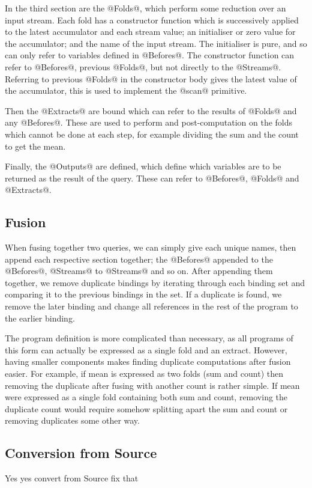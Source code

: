 In the third section are the @Folds@, which perform some reduction over an input stream.
Each fold has a constructor function which is successively applied to the latest accumulator and each stream value; an initialiser or zero value for the accumulator; and the name of the input stream.
The initialiser is pure, and so can only refer to variables defined in @Befores@.
The constructor function can refer to @Befores@, previous @Folds@, but not directly to the @Streams@.
Referring to previous @Folds@ in the constructor body gives the latest value of the accumulator, this is used to implement the @scan@ primitive.

Then the @Extracts@ are bound which can refer to the results of @Folds@ and any @Befores@.
These are used to perform and post-computation on the folds which cannot be done at each step, for example dividing the sum and the count to get the mean.

Finally, the @Outputs@ are defined, which define which variables are to be returned as the result of the query.
These can refer to @Befores@, @Folds@ and @Extracts@.

\subsection{Fusion}

When fusing together two queries, we can simply give each unique names, then append each respective section together; the @Befores@ appended to the @Befores@, @Streams@ to @Streams@ and so on.
After appending them together, we remove duplicate bindings by iterating through each binding set and comparing it to the previous bindings in the set.
If a duplicate is found, we remove the later binding and change all references in the rest of the program to the earlier binding.

The program definition is more complicated than necessary, as all programs of this form can actually be expressed as a single fold and an extract.
However, having smaller components makes finding duplicate computations after fusion easier.
For example, if mean is expressed as two folds (sum and count) then removing the duplicate after fusing with another count is rather simple.
If mean were expressed as a single fold containing both sum and count, removing the duplicate count would require somehow splitting apart the sum and count or removing duplicates some other way.


\subsection{Conversion from Source}

Yes yes convert from Source fix that



